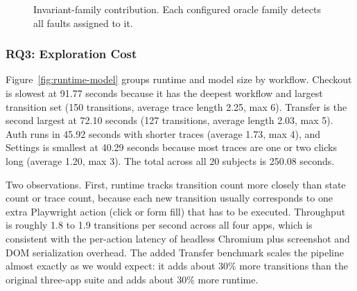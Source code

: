 \documentclass[sigconf,nonacm]{acmart}
\begin{document}
\begin{figure}[t]
  \centering
  \caption{Invariant-family contribution. Each configured oracle family detects all faults assigned to it.}
  \label{fig:oracle-family}
\end{figure}

\subsubsection{RQ3: Exploration Cost}
Figure~\ref{fig:runtime-model} groups runtime and model size by workflow. Checkout is slowest at 91.77 seconds because it has the deepest workflow and largest transition set (150 transitions, average trace length 2.25, max 6). Transfer is the second largest at 72.10 seconds (127 transitions, average length 2.03, max 5). Auth runs in 45.92 seconds with shorter traces (average 1.73, max 4), and Settings is smallest at 40.29 seconds because most traces are one or two clicks long (average 1.20, max 3). The total across all 20 subjects is 250.08 seconds.

Two observations. First, runtime tracks transition count more closely than state count or trace count, because each new transition usually corresponds to one extra Playwright action (click or form fill) that has to be executed. Throughput is roughly 1.8 to 1.9 transitions per second across all four apps, which is consistent with the per-action latency of headless Chromium plus screenshot and DOM serialization overhead. The added Transfer benchmark scales the pipeline almost exactly as we would expect: it adds about 30\% more transitions than the original three-app suite and adds about 30\% more runtime.
\end{document}
